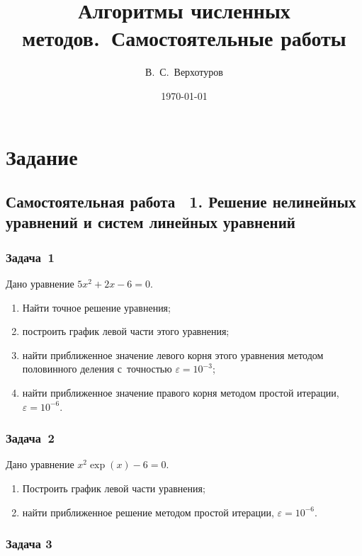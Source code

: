\documentclass[10pt, a4paper, titlepage]{article}
\title{Алгоритмы численных методов.~Самостоятельные работы}
\author{В.~С.~Верхотуров}
\affil{БСБО-05-20}
\affil{РТУ МИРЭА}
\date\today
\begin{document}
\maketitle
\tableofcontents
\newpage

\section*{Задание}


\subsection*{Самостоятельная работа \textnumero~1. Решение нелинейных уравнений и систем линейных уравнений}

\subsubsection*{Задача~1}

Дано уравнение $5x^2+2x-6=0$.

\begin{enumerate}
    \item Найти точное решение уравнения;
    \item построить график левой части этого уравнения;
    \item найти приближенное значение левого корня этого уравнения методом половинного деления с~точностью $\varepsilon=10^{-3}$;
    \item найти приближенное значение правого корня методом простой итерации, $\varepsilon=10^{-6}$.
\end{enumerate}

\subsubsection*{Задача~2}

Дано уравнение $x^2\exp(x)-6=0$.

\begin{enumerate}
    \item Построить график левой части уравнения;
    \item найти приближенное решение методом простой итерации, $\varepsilon=10^{-6}$.
\end{enumerate}

\subsubsection*{Задача 3}
\end{document}
